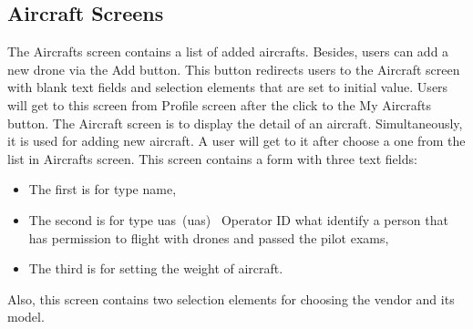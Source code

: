\subsection{Aircraft Screens}\label{subsec:aircraft-screens}
The Aircrafts screen contains a list of added aircrafts.
Besides, users can add a new drone via the Add button.
This button redirects users to the Aircraft screen with blank text fields and selection elements that are set to initial value.
Users will get to this screen from Profile screen after the click to the My Aircrafts button.
\newpage
The Aircraft screen is to display the detail of an aircraft.
Simultaneously, it is used for adding new aircraft.
A user will get to it after choose a one from the list in Aircrafts screen.
This screen contains a form with three text fields:
\begin{itemize}
    \item The first is for type name,
    \item The second is for type \acrshort{uas}~(\acrlong{uas})~\cite{uas} Operator ID what identify a person that has permission to flight with drones and passed the pilot exams,
    \item The third is for setting the weight of aircraft.
\end{itemize}
Also, this screen contains two selection elements for choosing the vendor and its model.
